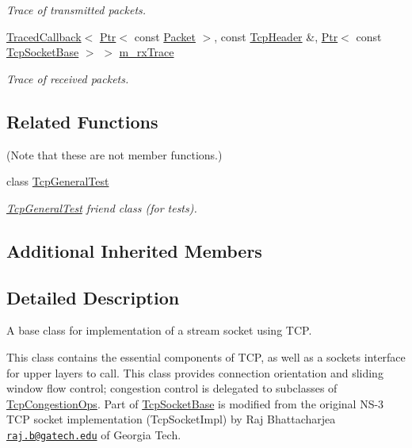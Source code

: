 \begin{DoxyCompactItemize}
\begin{DoxyCompactList}\small\item\em Trace of transmitted packets. \end{DoxyCompactList}\item 
\hyperlink{classns3_1_1TracedCallback}{Traced\+Callback}$<$ \hyperlink{classns3_1_1Ptr}{Ptr}$<$ const \hyperlink{classns3_1_1Packet}{Packet} $>$, const \hyperlink{classns3_1_1TcpHeader}{Tcp\+Header} \&, \hyperlink{classns3_1_1Ptr}{Ptr}$<$ const \hyperlink{classns3_1_1TcpSocketBase}{Tcp\+Socket\+Base} $>$ $>$ \hyperlink{classns3_1_1TcpSocketBase_a27b35f098b956baf89388fff0d4e539b}{m\+\_\+rx\+Trace}
\begin{DoxyCompactList}\small\item\em Trace of received packets. \end{DoxyCompactList}\end{DoxyCompactItemize}
\subsection*{Related Functions}
(Note that these are not member functions.) \begin{DoxyCompactItemize}
\item 
class \hyperlink{classns3_1_1TcpSocketBase_a9e3da14f8f21e0ea02af26ce426e4804}{Tcp\+General\+Test}
\begin{DoxyCompactList}\small\item\em \hyperlink{classns3_1_1TcpGeneralTest}{Tcp\+General\+Test} friend class (for tests). \end{DoxyCompactList}\end{DoxyCompactItemize}
\subsection*{Additional Inherited Members}


\subsection{Detailed Description}
A base class for implementation of a stream socket using T\+CP. 

This class contains the essential components of T\+CP, as well as a sockets interface for upper layers to call. This class provides connection orientation and sliding window flow control; congestion control is delegated to subclasses of \hyperlink{classns3_1_1TcpCongestionOps}{Tcp\+Congestion\+Ops}. Part of \hyperlink{classns3_1_1TcpSocketBase}{Tcp\+Socket\+Base} is modified from the original N\+S-\/3 T\+CP socket implementation (Tcp\+Socket\+Impl) by Raj Bhattacharjea \href{mailto:raj.b@gatech.edu}{\tt raj.\+b@gatech.\+edu} of Georgia Tech.

